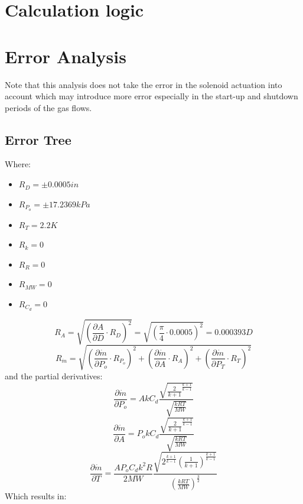 \documentclass{article}
\newcommand{\dps }{ A k C_{d} \frac{\sqrt{\frac{2}{k+1}^{\frac{k+1}{k-1}}}}{\sqrt{\frac{kRT}{MW}}}}
\newcommand{\das}{P_o k C_{d} \frac{\sqrt{\frac{2}{k+1}^{\frac{k+1}{k-1}}}}{\sqrt{\frac{kRT}{MW}}}}
\newcommand{\dts}{ \frac{ A P_o C_{d} k^2 R}{2MW}
\frac{ \sqrt{2^{\frac{k+1}{k-1}}\left(\frac{1}{k+1}\right)^{\frac{k+1}{k-1}}}}
{\left(\frac{kRT}{MW}\right)^{\frac{3}{2}}}}
\begin{document}
\section{Calculation logic}
    \begin{figure}[H]
            \begin{center}
                
            \end{center}
            \end{figure}
\section{Error Analysis}
    Note that this analysis does not take the error in the solenoid actuation into account which may introduce more error especially in the start-up and shutdown periods of the gas flows. \\
    \subsection{Error Tree}
    
            \begin{figure}[h]
            \begin{center}
            
            \end{center}
            \end{figure}
        Where:
        {\renewcommand\labelitemi{}
            \begin{itemize}
                \item  $R_{D} = \pm 0.0005in$
                \item  $R_{P_{o}} = \pm 17.2369 kPa$
                \item  $R_{T} = 2.2 K$
                \item  $R_{k} = 0$
                \item  $R_{R} = 0$
                \item  $R_{MW} = 0$
                \item  $R_{C_{d}} = 0$
            
            \end{itemize}
        }
        \[
            R_A=\sqrt{\left(\frac{\partial A}{\partial D}\cdot R_{D}\right)^2}=\sqrt{\left(\frac{\pi}{4}\cdot0.0005\right)^2}=0.000393D
        \]
        \[
            R_{\dot{m}}=\sqrt{\left(\frac{\partial \dot{m}}{\partial P_{o}}\cdot R_{P_{o}}\right) ^2+\left(\frac{\partial \dot{m}}{\partial A}\cdot R_{A}\right) ^2+\left(\frac{\partial \dot{m}}{\partial P_T}\cdot R_{T}\right) ^2}
        \]
        and the partial derivatives:
        \[
            \frac{\partial \dot{m}}{\partial P_o} = \dps%
        \]
        \[
            \frac{\partial \dot{m}}{\partial A} = \das %
        \]
        \[
            \frac{\partial \dot{m}}{\partial T} = \dts%
        \]
        Which results in: 
        
\end{document}
